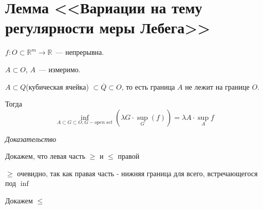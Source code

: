 \documentclass[paper=a4, fontsize=17pt]{article}
\begin{document}
\section{Лемма <<Вариации на тему регулярности меры Лебега>>}
$f: O \subset \mathds{R}^m \rightarrow \mathds{R}$~--- непрерывна.

$A \subset O$, $A$~--- измеримо.

$A \subset Q$(кубическая ячейка) $\subset \overline Q \subset O$, то есть граница $A$ не лежит на границе $O$.

Тогда $$\inf_{A \subset G \subset O, G - open ~ set} (\lambda G \cdot \sup_G(f)) = \lambda A \cdot \sup_A f$$

\emph{Доказательство}

Докажем, что левая часть $\geqslant$ и $\leqslant$ правой

$\geqslant$ очевидно, так как правая часть - нижняя граница для всего, встречающегося под $\inf$

Докажем $\leqslant$
\end{document}
